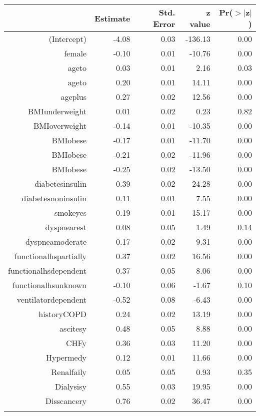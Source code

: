 \bigskip\bigskip
\centering
\begin{tabular}{rrrrr}
  \hline
 & Estimate & Std. Error & z value & Pr($>$$|$z$|$) \\ 
  \hline
(Intercept) & -4.08 & 0.03 & -136.13 & 0.00 \\ 
  female & -0.10 & 0.01 & -10.76 & 0.00 \\ 
  age\-65\-to\-74 & 0.03 & 0.01 & 2.16 & 0.03 \\ 
  age\-75\-to\-84 & 0.20 & 0.01 & 14.11 & 0.00 \\ 
  age\-85\-plus & 0.27 & 0.02 & 12.56 & 0.00 \\ 
  BMI\-underweight & 0.01 & 0.02 & 0.23 & 0.82 \\ 
  BMI\-overweight & -0.14 & 0.01 & -10.35 & 0.00 \\ 
  BMI\-obese\-1 & -0.17 & 0.01 & -11.70 & 0.00 \\ 
  BMI\-obese\-2 & -0.21 & 0.02 & -11.96 & 0.00 \\ 
  BMI\-obese\-3 & -0.25 & 0.02 & -13.50 & 0.00 \\ 
  diabetes\-insulin & 0.39 & 0.02 & 24.28 & 0.00 \\ 
  diabetes\-noninsulin & 0.11 & 0.01 & 7.55 & 0.00 \\ 
  smoke\-yes & 0.19 & 0.01 & 15.17 & 0.00 \\ 
  dyspnea\-rest & 0.08 & 0.05 & 1.49 & 0.14 \\ 
  dyspnea\-moderate & 0.17 & 0.02 & 9.31 & 0.00 \\ 
  functional\-hs\-partially & 0.37 & 0.02 & 16.56 & 0.00 \\ 
  functional\-hs\-dependent & 0.37 & 0.05 & 8.06 & 0.00 \\ 
  functional\-hs\-unknown & -0.10 & 0.06 & -1.67 & 0.10 \\ 
  ventilator\-dependent & -0.52 & 0.08 & -6.43 & 0.00 \\ 
  history\-COPD & 0.24 & 0.02 & 13.19 & 0.00 \\ 
  ascites\-y & 0.48 & 0.05 & 8.88 & 0.00 \\ 
  CHF\-y & 0.36 & 0.03 & 11.20 & 0.00 \\ 
  Hyper\-med\-y & 0.12 & 0.01 & 11.66 & 0.00 \\ 
  Renal\-fail\-y & 0.05 & 0.05 & 0.93 & 0.35 \\ 
  Dialysis\-y & 0.55 & 0.03 & 19.95 & 0.00 \\ 
  Diss\-cancer\-y & 0.76 & 0.02 & 36.47 & 0.00 \\ 
$$
\end{tabular}
